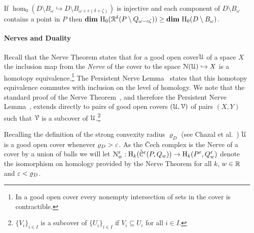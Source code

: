 
\begin{lemma}\label{lem:assumption2}
  If $\hom_0(D\setminus B_\omega\hookrightarrow D\setminus B_{\omega+c(\delta+\zeta)})$ is injective and each component of $D\setminus B_\omega$ contains a point in $P$ then $\mathbf{dim}~\mathrm{H}_0(\mathcal{R}^\delta(P\setminus Q_{\omega-c\zeta})) \geq \mathbf{dim}~\mathrm{H}_0(D\setminus B_\omega)$.
\end{lemma}

\paragraph*{Nerves and Duality}

Recall that the Nerve Theorem states that for a good open cover$\mathcal{U}$ of a space $X$ the inclusion map from the \emph{Nerve} of the cover to the space $\mathcal{N}(\mathcal{U})\hookrightarrow X$ is a homotopy equivalence.\footnote{In a good open cover every nonempty intersection of sets in the cover is contractible.}
The Persistent Nerve Lemma~\cite{chazal08towards} states that this homotopy equivalence commutes with inclusion on the level of homology.
We note that the standard proof of the Nerve Theorem~\cite{kozlov07combinatorial}, and therefore the Persistent Nerve Lemma~\cite{chazal08towards}, extends directly to pairs of good open covers $(\mathcal{U}, \mathcal{V})$ of pairs $(X, Y)$ such that $\mathcal{V}$ is a subcover of $\mathcal{U}$.\footnote{$\{V_i\}_{i\in I}$ is a subcover of $\{U_i\}_{i\in I}$ if $V_i\subseteq U_i$ for all $i\in I$.}

Recalling the definition of the strong convexity radius $\varrho_D$ (see Chazal et al.~\cite{chazal09analysis}) $\mathcal{U}$ is a good open cover whenever $\varrho_D > \varepsilon$.
As the \v Cech complex is the Nerve of a cover by a union of balls we will let $\mathcal{N}_w^\varepsilon : \mathrm{H}_k(\check{\mathcal{C}}^\varepsilon(P,Q_w))\to \mathrm{H}_k(P^\varepsilon, Q_w^\varepsilon)$ denote the isomorphism on homology provided by the Nerve Theorem for all $k$, $w\in\mathbb{R}$ and $\varepsilon < \varrho_D$.

